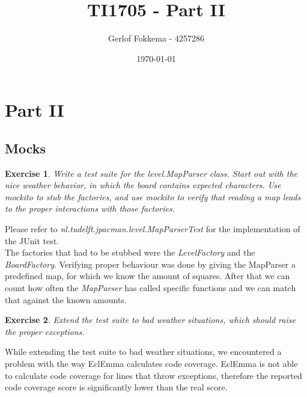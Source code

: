 \documentclass[a4paper]{article}
\title{TI1705 - Part II}
\author{Gerlof Fokkema - 4257286}
\date{\today}
\newtheorem{thm}{Exercise}
\begin{document}
  \maketitle
  \section{Part II}
  
  \subsection{Mocks}
    \begin{thm}
      Write a test suite for the level.MapParser class. Start out with the nice
      weather behavior, in which the board contains expected characters. Use mockito
      to stub the factories, and use mockito to verify that reading a map leads to the
      proper interactions with those factories.
    \end{thm}
    Please refer to \textit{nl.tudelft.jpacman.level.MapParserTest} for the implementation of the JUnit test. \\
    The factories that had to be stubbed were the \textit{LevelFactory} and the \textit{BoardFactory}.
    Verifying proper behaviour was done by giving the MapParser a predefined map, for which we know the amount of squares.
    After that we can count how often the \textit{MapParser} has called specific functions and we can match that against the known amounts.

    \begin{thm}
      Extend the test suite to bad weather situations,
      which should raise the proper exceptions.
    \end{thm}
    While extending the test suite to bad weather situations, we encountered a problem with the way EclEmma calculates code coverage.
    EclEmma is not able to calculate code coverage for lines that throw exceptions, therefore the reported code coverage score is significantly lower than the real score.
  
  \newpage
\end{document}
